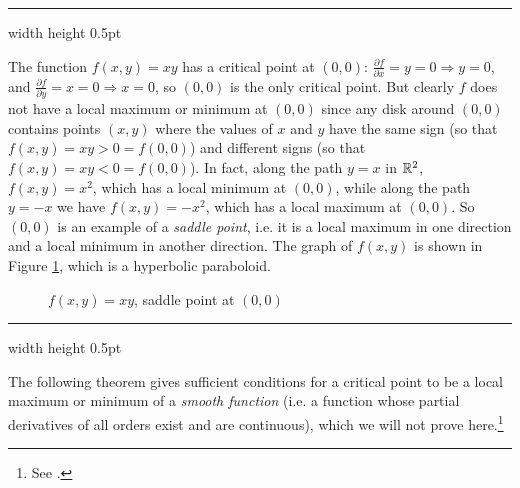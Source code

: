 \vspace{3mm}
\hrule width \textwidth height 0.5pt
\begin{exmp}
 The function $f(x,y) = xy$ has a critical point at $(0,0)$: $\frac{\partial f}{\partial x} = y = 0 \Rightarrow y=0$,
 and $\frac{\partial f}{\partial y} = x = 0 \Rightarrow x=0$, so $(0,0)$ is the only critical point. But clearly $f$
 does not have a local maximum or minimum at $(0,0)$ since any disk around $(0,0)$ contains points $(x,y)$ where the
 values of $x$ and $y$ have the same sign (so that $f(x,y) = xy > 0 = f(0,0)$) and different signs (so that $f(x,y) =
 xy < 0 = f(0,0)$). In fact, along the path $y=x$ in $\mathbb{R}^{2}$, $f(x,y) = x^2$, which has a
\newpage
\noindent local minimum at $(0,0)$,
 while along the path $y=-x$ we have $f(x,y)=-x^2$, which has a local maximum at $(0,0)$. So $(0,0)$ is an example of a
 \emph{saddle point}, i.e. it is a local maximum in one direction and a local minimum in another direction. The graph
 of $f(x,y)$ is shown in Figure \ref{fig:xy}, which is a hyperbolic paraboloid.
\end{exmp}\vspace{-16mm}
\begin{figure}[h]
 \begin{center}
  
 \end{center}\vspace{-18mm}
 \caption[]{\quad $f(x,y) = xy$, saddle point at $(0,0)$}
 \label{fig:xy}
\end{figure}
\hrule width \textwidth height 0.5pt
\vspace{3mm}

The following theorem gives sufficient conditions for a critical point to be a local maximum or
minimum of a \emph{smooth function} (i.e. a function whose partial derivatives of all orders
exist and are continuous), which we will not prove here.\footnote{See \cite[\S\,7.6]{tm}.}


